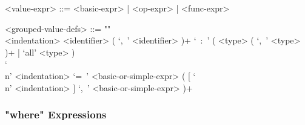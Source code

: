 \documentclass{article}
\begin{document}
\begin{itemize}
\begin{grammar}
<value-expr> ::= <basic-expr> | <op-expr> | <func-expr> 

<grouped-value-defs> ::= ""\\
<indentation> <identifier> ( `,\ ' <identifier> )+ `\ :\ '
( <type> ( `,\ ' <type> )+ | `all' <type> ) \\
`\\n' <indentation> `=\ '
<basic-or-simple-expr> ( [ `\\n' <indentation> ] `,\ ' <basic-or-simple-expr> )+
\end{grammar}

\end{itemize}

\subsubsection{"where" Expressions}
\end{document}
